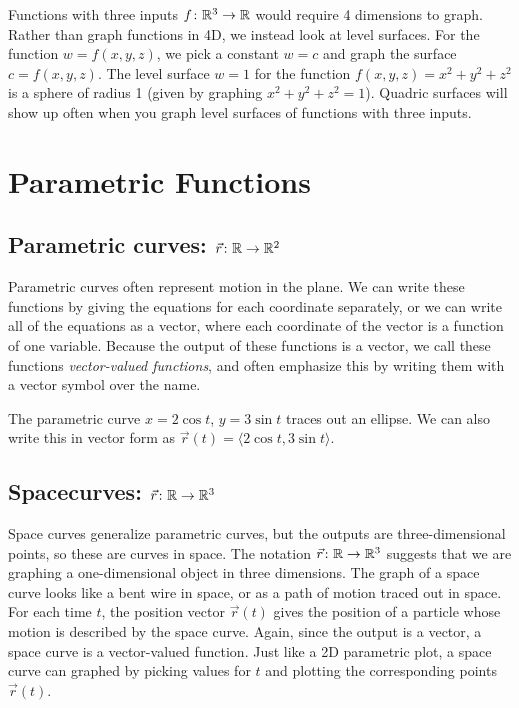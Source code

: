 Functions with three inputs {$f\colon {\ensuremath{\mathbb{R}}}^3\to {\ensuremath{\mathbb{R}}}$} would require 4
dimensions to graph.  Rather than graph functions in 4D, we instead
look at level surfaces. For the function $w=f(x,y,z)$, we pick a
constant $w=c$ and graph the surface $c=f(x,y,z)$.  The level surface
$w=1$ for the function $f(x,y,z)=x^2+y^2+z^2$ is a sphere of radius 1
(given by graphing $x^2+y^2+z^2=1$).  Quadric surfaces will show up
often when you graph level surfaces of functions with three inputs.


\section{Parametric Functions}

\subsection{Parametric curves: {$\vec r\colon \mathbb{R}\to \mathbb{R}^2$}}
Parametric curves often represent motion in the plane.  We can write
these functions by giving the equations for each coordinate
separately, or we can write all of the equations as a vector, where
each coordinate of the vector is a function of one variable.  Because
the output of these functions is a vector, we call these functions
\emph{vector-valued functions}, and often emphasize this by writing
them with a vector symbol over the name.


\begin{example}
  The parametric curve $x=2\cos t$, $y=3\sin t$ traces out an ellipse.
  We can also write this in vector form as $\vec r(t) = \langle2\cos
  t, 3\sin t\rangle$.
\end{example}

\subsection{Spacecurves: {$\vec r\colon \mathbb{R}\to \mathbb{R}^3$}}
Space curves generalize parametric curves, but the outputs are
three-dimensional points, so these are curves in space.  The notation
{$\vec r\colon \mathbb{R} \to \mathbb{R}^3$} suggests that we are graphing a
one-dimensional object in three dimensions. The graph of a space curve
looks like a bent wire in space, or as a path of motion traced out in
space.  For each time $t$, the position vector $\vec r(t)$ gives the
position of a particle whose motion is described by the space curve.
Again, since the output is a vector, a space curve is a vector-valued
function.  Just like a 2D parametric plot, a space curve can graphed
by picking values for $t$ and plotting the corresponding points $\vec
r(t)$.

